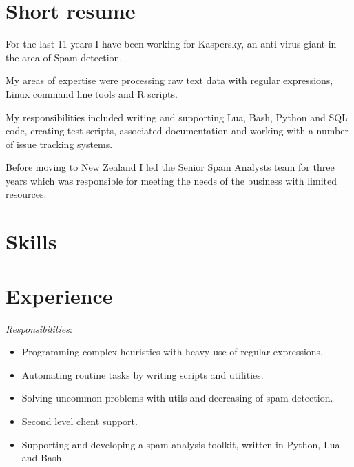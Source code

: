 \documentclass[11pt,a4paper,sans]{moderncv}        %
\newcommand{\responsibilities}[1]{ \emph{Responsibilities}:\begin{itemize} #1\end{itemize}}
\begin{document}
\makecvtitle

\section{Short resume}

For the last 11 years I have been working for Kaspersky, an anti-virus giant in the area of Spam detection.

My areas of expertise were processing raw text data with regular expressions, Linux command line tools and R scripts.

My responsibilities included writing and supporting Lua, Bash, Python and SQL code, creating test scripts, associated documentation and working with a number of issue tracking systems.

Before moving to New Zealand I led the Senior Spam Analysts team for three years which was responsible for meeting the needs of the business with limited resources.



\section{Skills}


\section{Experience}

 {
    \responsibilities {
        \item Programming complex heuristics with heavy use of regular expressions.
        \item Automating routine tasks by writing scripts and utilities.
        \item Solving uncommon problems with utils and decreasing of spam detection.
        \item Second level client support.
	\item Supporting and developing a spam analysis toolkit, written in Python, Lua and Bash.
    }
}
\end{document}
